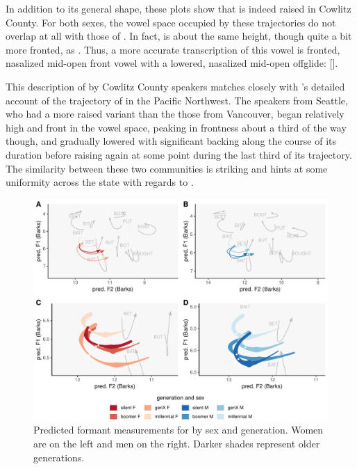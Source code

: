 In addition to its general shape, these plots show that \ban is indeed raised in Cowlitz County. For both sexes, the vowel space occupied by these trajectories do not overlap at all with those of \bat. In fact, \ban is about the same height, though quite a bit more fronted, as \bet. Thus, a more accurate transcription of this vowel is fronted, nasalized mid-open front vowel with a lowered, nasalized mid-open offglide: [].

This description of \ban by Cowlitz County speakers matches closely with \citeauthor{swan_2016_proceedings}'s \citeyearpar[10--12]{swan_2016_proceedings} detailed account of the trajectory of \ban in the Pacific Northwest. The speakers from Seattle, who had a more raised variant than the those from Vancouver, began \ban relatively high and front in the vowel space, peaking in frontness about a third of the way though, and gradually lowered with significant backing along the course of its duration before raising again at some point during the last third of its trajectory. The similarity between these two communities is striking and hints at some uniformity across the state with regards to \ban.

\begin{figure}[tb!]
	\centering
	\includegraphics[width = 6.5in]{Figures/BAN/BAN_four_panel_plot.pdf}
	\caption[Predicted formant measurements for \ban by sex and generation.]{Predicted formant measurements for \ban by sex and generation. Women are on the left and men on the right. Darker shades represent older generations.}
	\label{fig:BAN_four_panel}
\end{figure}

